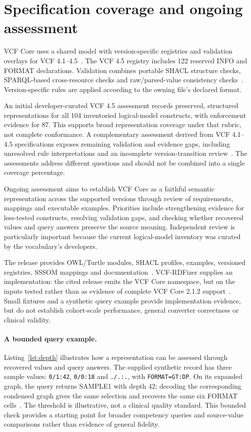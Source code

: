 \documentclass{ceurart}
\newcommand{\term}[1]{\texttt{#1}}
\begin{document}
\section{Specification coverage and ongoing assessment}
\label{sec:coverage}

VCF Core uses a shared model with version-specific registries and validation overlays for VCF 4.1--4.5~\cite{vcfc210}.
The VCF 4.5 registry includes 122 reserved INFO and FORMAT declarations.
Validation combines portable SHACL structure checks, SPARQL-based cross-resource checks and raw/parsed-value consistency checks~\cite{shacl2017,vcfc210}.
Version-specific rules are applied according to the owning file's declared format.

An initial developer-curated VCF 4.5 assessment records preserved, structured representations for all 104 inventoried logical-model constructs, with enforcement evidence for 87.
This supports broad representation coverage under that rubric, not complete conformance.
A complementary assessment derived from VCF 4.1--4.5 specifications exposes remaining validation and evidence gaps, including unresolved rule interpretations and an incomplete version-transition review~\cite{vcfc210}.
The assessments address different questions and should not be combined into a single coverage percentage.

Ongoing assessment aims to establish VCF Core as a faithful semantic representation across the supported versions through review of requirements, mappings and executable examples.
Priorities include strengthening evidence for less-tested constructs, resolving validation gaps, and checking whether recovered values and query answers preserve the source meaning.
Independent review is particularly important because the current logical-model inventory was curated by the vocabulary's developers.

The release provides OWL/Turtle modules, SHACL profiles, examples, versioned registries, SSSOM mappings and documentation~\cite{vcfc210}.
VCF-RDFizer supplies an implementation: the cited release emits the VCF Core namespace, but on the inputs tested rather than as evidence of complete VCF Core 2.1.2 support~\cite{vcfrConverter2026}.
Small fixtures and a synthetic query example provide implementation evidence, but do not establish cohort-scale performance, general converter correctness or clinical validity.


\paragraph{A bounded query example.}
Listing~\ref{lst:depth} illustrates how a representation can be assessed through recovered values and query answers.
The supplied synthetic record has three sample values: \term{0/1:42}, \term{0/0:18} and \term{./.:.}, with \term{FORMAT=GT:DP}.
On its expanded graph, the query returns SAMPLE1 with depth 42; decoding the corresponding condensed graph gives the same selection and recovers the same six FORMAT cells~\cite{vcfc210}.
The threshold is illustrative, not a clinical quality standard.
This bounded check provides a starting point for broader competency queries and source-value comparisons rather than evidence of general fidelity.
\end{document}
